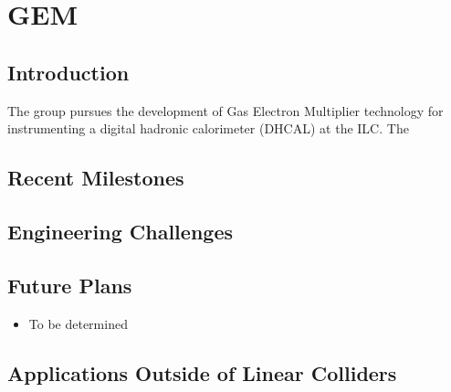 \section{GEM}
\subsection{Introduction}
The group pursues the development of Gas Electron Multiplier technology for instrumenting a digital hadronic calorimeter (DHCAL) at the ILC. The 
\subsection{Recent Milestones}
\subsection{Engineering Challenges}
\subsection{Future Plans}
\begin{itemize}
\item To be determined
\end{itemize}
\subsection{Applications Outside of Linear Colliders}
